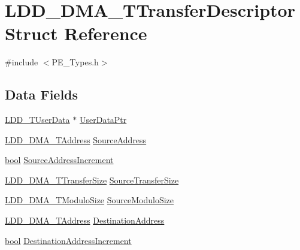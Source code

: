 \hypertarget{struct_l_d_d___d_m_a___t_transfer_descriptor}{}\section{L\+D\+D\+\_\+\+D\+M\+A\+\_\+\+T\+Transfer\+Descriptor Struct Reference}
\label{struct_l_d_d___d_m_a___t_transfer_descriptor}


{\ttfamily \#include $<$P\+E\+\_\+\+Types.\+h$>$}

\subsection*{Data Fields}
\begin{DoxyCompactItemize}
\item 
\hyperlink{group___p_e___types__module_ga0b66a73f87238a782318aa0be7578e35}{L\+D\+D\+\_\+\+T\+User\+Data} $\ast$ \hyperlink{struct_l_d_d___d_m_a___t_transfer_descriptor_a8e77b9d030b00c231823350a904e0f83}{User\+Data\+Ptr}
\item 
\hyperlink{group___p_e___types__module_gab8287f62db7ff96992355760b652cd07}{L\+D\+D\+\_\+\+D\+M\+A\+\_\+\+T\+Address} \hyperlink{struct_l_d_d___d_m_a___t_transfer_descriptor_ad5ae78062f8199ddc7ca0e1a25f532b7}{Source\+Address}
\item 
\hyperlink{group___p_e___types__module_ga97a80ca1602ebf2303258971a2c938e2}{bool} \hyperlink{struct_l_d_d___d_m_a___t_transfer_descriptor_a781cca214defc25b025c7cf6b9d1832f}{Source\+Address\+Increment}
\item 
\hyperlink{group___p_e___types__module_ga868f08f9448e5df27a38314f0893d84a}{L\+D\+D\+\_\+\+D\+M\+A\+\_\+\+T\+Transfer\+Size} \hyperlink{struct_l_d_d___d_m_a___t_transfer_descriptor_a47288b5f517584290dd087134d1eed2b}{Source\+Transfer\+Size}
\item 
\hyperlink{group___p_e___types__module_gacf2f2d4310e7634351c68e1f64a4c483}{L\+D\+D\+\_\+\+D\+M\+A\+\_\+\+T\+Modulo\+Size} \hyperlink{struct_l_d_d___d_m_a___t_transfer_descriptor_aeb186072b53de4ba7872bee22c044ebf}{Source\+Modulo\+Size}
\item 
\hyperlink{group___p_e___types__module_gab8287f62db7ff96992355760b652cd07}{L\+D\+D\+\_\+\+D\+M\+A\+\_\+\+T\+Address} \hyperlink{struct_l_d_d___d_m_a___t_transfer_descriptor_af0babeeccbb44dbec87aa44169d9ac57}{Destination\+Address}
\item 
\hyperlink{group___p_e___types__module_ga97a80ca1602ebf2303258971a2c938e2}{bool} \hyperlink{struct_l_d_d___d_m_a___t_transfer_descriptor_ac967e1976b0d86e0433968952a2408a8}{Destination\+Address\+Increment}

\end{DoxyCompactItemize}
